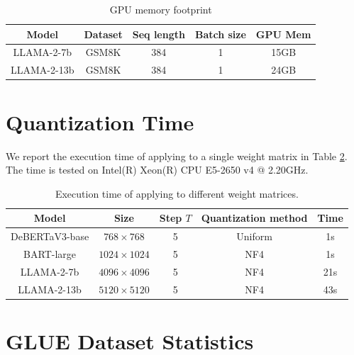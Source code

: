 \begin{table}[htb]
\centering
\caption{GPU memory footprint}
\begin{tabular}{c|c|c|c|c}
\toprule
{\bf Model} & {\bf Dataset}  & {\bf Seq length} & {\bf Batch size}  & {\bf GPU Mem}   \\
\midrule
LLAMA-2-7b & GSM8K & 384 & 1 & 15GB \\
LLAMA-2-13b & GSM8K & 384 & 1 & 24GB \\
\bottomrule
\end{tabular}
\label{tab:mem_footprint}
\end{table}

\section{Quantization Time}
We report the execution time of {\OurAlg} applying to a single weight matrix in Table \ref{tab:model-arch2}. The time is tested on Intel(R) Xeon(R) CPU E5-2650 v4 @ 2.20GHz.
\begin{table}[htb]
\centering
\caption{Execution time of {\OurAlg} applying to different weight matrices.}
\begin{tabular}{c|c|c|c|c}
\toprule
{\bf Model} & {\bf Size} & {\bf Step $T$} & {\bf Quantization method}  & {\bf Time}   \\
\midrule
DeBERTaV3-base & $768\times 768$ & 5& Uniform & 1s\\
BART-large & $1024\times 1024$ & 5 & NF4 & 1s\\
LLAMA-2-7b & $4096\times 4096$ & 5 & NF4 & 21s\\
LLAMA-2-13b & $5120\times 5120$ & 5 & NF4 & 43s\\
\bottomrule
\end{tabular}
\label{tab:model-arch2}
\end{table}

\section{GLUE Dataset Statistics}
\label{app:dataset-glue}

